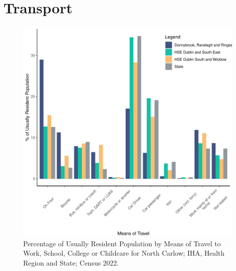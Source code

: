 \documentclass{article}
\begin{document}
\section{Transport}\label{sect:Trans}
\begin{figure}[H]
	\centering
	\includegraphics[width = 120mm]{../figures/TravelED.pdf}
	\caption{Percentage of Usually Resident Population by Means of Travel to Work, School, College or Childcare for North Carlow; IHA, Health Region and State; Census 2022.}
	\label{fig:vbnv}
	\end{figure}
\end{document}
